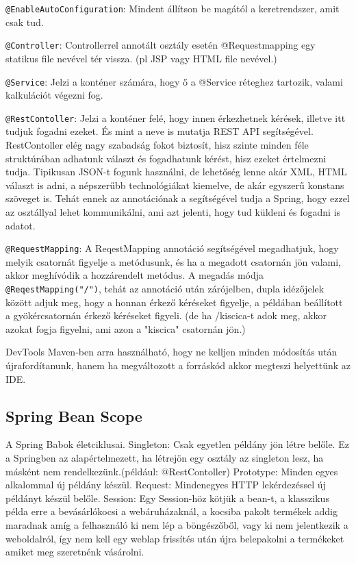 \documentclass[11pt]{article}
\begin{document}
\texttt{@EnableAutoConfiguration}: Mindent állítson be magától a keretrendszer, amit csak tud.

\texttt{@Controller}: Controllerrel annotált osztály esetén @Requestmapping egy statikus file nevével tér vissza. (pl JSP vagy HTML file nevével.)

\texttt{@Service}: Jelzi a konténer számára, hogy ő a @Service réteghez tartozik, valami kalkulációt végezni fog.

\texttt{@RestContoller}:
Jelzi a konténer felé, hogy innen érkezhetnek kérések, illetve itt tudjuk fogadni ezeket. És mint a neve is mutatja REST API segítségével. RestContoller elég nagy szabadság fokot biztosít, hisz szinte minden féle struktúrában adhatunk választ és fogadhatunk kérést, hisz ezeket értelmezni tudja. Tipikusan JSON-t fogunk használni, de lehetőség lenne akár XML, HTML választ is adni, a népszerűbb technológiákat kiemelve, de akár egyszerű konstans szöveget is. Tehát ennek az annotációnak a segítségével tudja a Spring, hogy ezzel az osztállyal lehet kommunikálni, ami azt jelenti, hogy tud küldeni és fogadni is adatot.

\texttt{@RequestMapping}:
A ReqestMapping annotáció segítségével megadhatjuk, hogy melyik csatornát figyelje a metódusunk, és ha a megadott csatornán jön valami, akkor meghívódik a hozzárendelt metódus.  A megadás módja \texttt{@ReqestMapping("/")}, tehát az annotáció után zárójelben, dupla idézőjelek között adjuk meg, hogy a honnan érkező kéréseket figyelje, a példában beállított a gyökércsatornán érkező kéréseket figyeli. (de ha /kiscica-t adok meg, akkor azokat fogja figyelni, ami azon a "kiscica" csatornán jön.)

DevTools Maven-ben arra használható, hogy ne kelljen minden módosítás után újrafordítanunk, hanem ha megváltozott a forráskód akkor megteszi helyettünk az IDE.

\subsection{Spring Bean Scope}

A Spring Babok életciklusai.
Singleton: Csak egyetlen példány jön létre belőle. Ez a Springben az alapértelmezett, ha létrejön egy osztály az singleton lesz, ha másként nem rendelkezünk.(például: @RestContoller)
Prototype: Minden egyes alkalommal új példány készül.
Request: Mindenegyes HTTP lekérdezéssel új példányt készül belőle.
Session: Egy Session-höz kötjük a bean-t, a klasszikus példa erre a bevásárlókocsi a webáruházaknál, a kocsiba pakolt termékek addig maradnak amíg a felhasználó ki nem lép a böngészőből, vagy ki nem jelentkezik a weboldalról, így nem kell egy weblap frissítés után újra belepakolni a termékeket amiket meg szeretnénk vásárolni.
\end{document}
